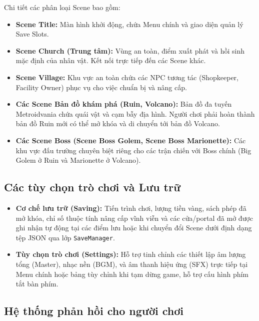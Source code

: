 \documentclass[../DoAn.tex]{subfiles}
\begin{document}
Chi tiết các phân loại Scene bao gồm:
\begin{itemize}
    \item \textbf{Scene Title:} Màn hình khởi động, chứa Menu chính và giao diện quản lý Save Slots.
    \item \textbf{Scene Church (Trung tâm):} Vùng an toàn, điểm xuất phát và hồi sinh mặc định của nhân vật. Kết nối trực tiếp đến các Scene khác.
    \item \textbf{Scene Village:} Khu vực an toàn chứa các NPC tương tác (Shopkeeper, Facility Owner) phục vụ cho việc chuẩn bị và nâng cấp.
    \item \textbf{Các Scene Bản đồ khám phá (Ruin, Volcano):} Bản đồ đa tuyến Metroidvania chứa quái vật và cạm bẫy địa hình. Người chơi phải hoàn thành bản đồ Ruin mới có thể mở khóa và di chuyển tới bản đồ Volcano.
    \item \textbf{Các Scene Boss (Scene Boss Golem, Scene Boss Marionette):} Các khu vực đấu trường chuyên biệt riêng cho các trận chiến với Boss chính (Big Golem ở Ruin và Marionette ở Volcano).
\end{itemize}

\subsection{Các tùy chọn trò chơi và Lưu trữ}
\label{subsection:3.3.5}

\begin{itemize}
    \item \textbf{Cơ chế lưu trữ (Saving):} Tiến trình chơi, lượng tiền vàng, sách phép đã mở khóa, chỉ số thuộc tính nâng cấp vĩnh viễn và các cửa/portal đã mở được ghi nhận tự động tại các điểm lưu hoặc khi chuyển đổi Scene dưới định dạng tệp JSON qua lớp \texttt{SaveManager}.
    \item \textbf{Tùy chọn trò chơi (Settings):} Hỗ trợ tinh chỉnh các thiết lập âm lượng tổng (Master), nhạc nền (BGM), và âm thanh hiệu ứng (SFX) trực tiếp tại Menu chính hoặc bảng tùy chỉnh khi tạm dừng game, hỗ trợ cấu hình phím tắt bàn phím.
\end{itemize}

\subsection{Hệ thống phản hồi cho người chơi}
\label{subsection:3.3.6}
\end{document}
